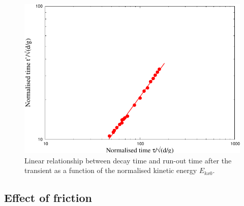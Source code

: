 \begin{figure}[tbhp]
\centering
\includegraphics[width=\textwidth]{tpTau}
\caption{Linear relationship between decay time and run-out time after the 
transient as a function of the normalised kinetic energy $E_{kx0}$.}
\label{fig:tpTau}
\end{figure}



\subsection{Effect of friction}
\label{sec:parameters}

